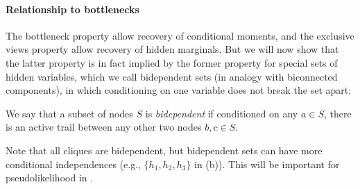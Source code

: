 \paragraph{Relationship to bottlenecks}


The bottleneck property allow recovery of conditional moments,
and the exclusive views property allow recovery of hidden marginals.
But we will now show that the latter property is in fact implied by the former
property for special sets of hidden variables, which we call bidependent
sets (in analogy with biconnected components),
in which conditioning on one variable does not break the set apart:
\begin{definition}
We say that a subset of nodes $S$ is \emph{bidependent} if
conditioned on any $a \in S$, there is an active trail between any other two nodes $b,c \in S$.
\end{definition}
Note that all cliques are bidependent, but bidependent sets can have more conditional independences
(e.g., $\{h_1,h_2,h_3\}$ in (b)).
This will be important for pseudolikelihood in .


